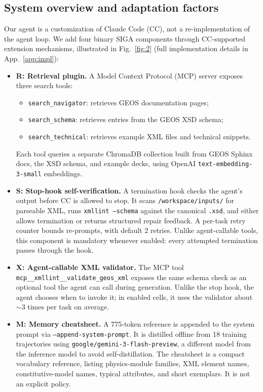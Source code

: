\documentclass{article}
\begin{document}
\subsection{System overview and adaptation factors}
\label{subsec:overview}

Our agent is a customization of Claude Code (CC), not a re-implementation of the agent loop. We add four binary SIGA components through CC-supported extension mechanisms, illustrated in Fig.~\ref{fig:2} (full implementation details in App.~\ref{app:impl}):

\begin{itemize}
    \item \textbf{R: Retrieval plugin.} A Model Context Protocol (MCP) server exposes three search tools:
    \begin{itemize}
        \item \texttt{search\_navigator}: retrieves GEOS documentation pages;
        \item \texttt{search\_schema}: retrieves entries from the GEOS XSD schema;
        \item \texttt{search\_technical}: retrieves example XML files and technical snippets.
    \end{itemize}
    Each tool queries a separate ChromaDB collection built from GEOS Sphinx docs, the XSD schema, and example decks, using OpenAI \texttt{text-embedding-3-small} embeddings.

    \item \textbf{S: Stop-hook self-verification.} A termination hook checks the agent's output before CC is allowed to stop. It scans \texttt{/workspace/inputs/} for parseable XML, runs \texttt{xmllint --schema} against the canonical \texttt{.xsd}, and either allows termination or returns structured repair feedback. A per-task retry counter bounds re-prompts, with default 2 retries. Unlike agent-callable tools, this component is mandatory whenever enabled: every attempted termination passes through the hook.

    \item \textbf{X: Agent-callable XML validator.} The MCP tool \texttt{mcp\_\_xmllint\_\_validate\_geos\_xml} exposes the same schema check as an optional tool the agent can call during generation. Unlike the stop hook, the agent chooses when to invoke it; in enabled cells, it uses the validator about ${\sim}3$ times per task on average.

    \item \textbf{M: Memory cheatsheet.} A 775-token reference is appended to the system prompt via \texttt{--append-system-prompt}. It is distilled offline from 18 training trajectories using \texttt{google/gemini-3-flash-preview}, a different model from the inference model to avoid self-distillation. The cheatsheet is a compact vocabulary reference, listing physics-module families, XML element names, constitutive-model names, typical attributes, and short exemplars. It is not an explicit policy.
\end{itemize}
\end{document}

